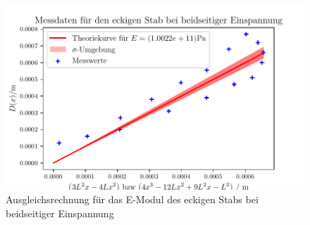   \begin{figure}
    \centering
    \includegraphics{build/plot9.pdf}
    \caption{Ausgleichsrechnung für das E-Modul des eckigen Stabs bei beidseitiger Einspannung}
    \label{fig:Messwerte4}
  \end{figure}
  \newpage
